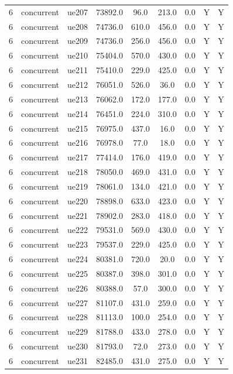 \begin{table}[ht]
\begin{tabular}{|c|c|c|c|c|c|c|c|c|}
6 & concurrent & ue207 & 73892.0 & 96.0 & 213.0 & 0.0 & Y & Y \\
6 & concurrent & ue208 & 74736.0 & 610.0 & 456.0 & 0.0 & Y & Y \\
6 & concurrent & ue209 & 74736.0 & 256.0 & 456.0 & 0.0 & Y & Y \\
6 & concurrent & ue210 & 75404.0 & 570.0 & 430.0 & 0.0 & Y & Y \\
6 & concurrent & ue211 & 75410.0 & 229.0 & 425.0 & 0.0 & Y & Y \\
6 & concurrent & ue212 & 76051.0 & 526.0 & 36.0 & 0.0 & Y & Y \\
6 & concurrent & ue213 & 76062.0 & 172.0 & 177.0 & 0.0 & Y & Y \\
6 & concurrent & ue214 & 76451.0 & 224.0 & 310.0 & 0.0 & Y & Y \\
6 & concurrent & ue215 & 76975.0 & 437.0 & 16.0 & 0.0 & Y & Y \\
6 & concurrent & ue216 & 76978.0 & 77.0 & 18.0 & 0.0 & Y & Y \\
6 & concurrent & ue217 & 77414.0 & 176.0 & 419.0 & 0.0 & Y & Y \\
6 & concurrent & ue218 & 78050.0 & 469.0 & 431.0 & 0.0 & Y & Y \\
6 & concurrent & ue219 & 78061.0 & 134.0 & 421.0 & 0.0 & Y & Y \\
6 & concurrent & ue220 & 78898.0 & 633.0 & 423.0 & 0.0 & Y & Y \\
6 & concurrent & ue221 & 78902.0 & 283.0 & 418.0 & 0.0 & Y & Y \\
6 & concurrent & ue222 & 79531.0 & 569.0 & 430.0 & 0.0 & Y & Y \\
6 & concurrent & ue223 & 79537.0 & 229.0 & 425.0 & 0.0 & Y & Y \\
6 & concurrent & ue224 & 80381.0 & 720.0 & 20.0 & 0.0 & Y & Y \\
6 & concurrent & ue225 & 80387.0 & 398.0 & 301.0 & 0.0 & Y & Y \\
6 & concurrent & ue226 & 80388.0 & 57.0 & 300.0 & 0.0 & Y & Y \\
6 & concurrent & ue227 & 81107.0 & 431.0 & 259.0 & 0.0 & Y & Y \\
6 & concurrent & ue228 & 81113.0 & 100.0 & 254.0 & 0.0 & Y & Y \\
6 & concurrent & ue229 & 81788.0 & 433.0 & 278.0 & 0.0 & Y & Y \\
6 & concurrent & ue230 & 81793.0 & 72.0 & 273.0 & 0.0 & Y & Y \\
6 & concurrent & ue231 & 82485.0 & 431.0 & 275.0 & 0.0 & Y & Y \\

\end{tabular}
\end{table}
